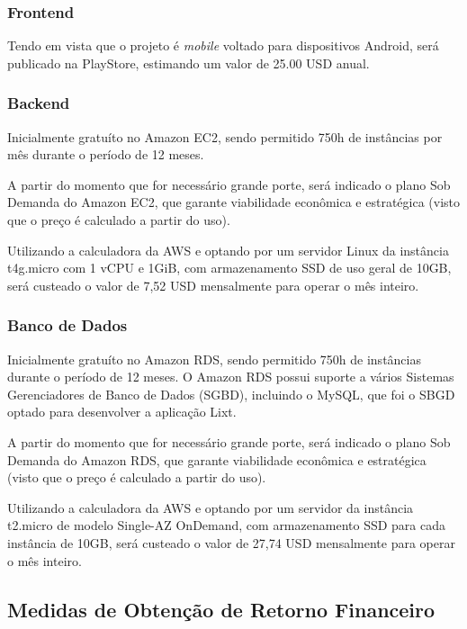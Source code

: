 \subsubsection{Frontend} 

Tendo em vista que o projeto é \textit{mobile} voltado para dispositivos Android, será publicado na PlayStore, estimando um valor de 25.00 USD anual. 

\subsubsection{Backend}

Inicialmente gratuíto no Amazon EC2, sendo permitido 750h de instâncias por mês durante o período de 12 meses.

A partir do momento que for necessário grande porte, será indicado o plano Sob Demanda do Amazon EC2, que garante viabilidade econômica e estratégica (visto que o preço é calculado a partir do uso). 

Utilizando a calculadora da AWS e optando por um servidor Linux da instância t4g.micro com 1 vCPU e 1GiB, com armazenamento SSD de uso geral de 10GB, será custeado o valor de 7,52 USD mensalmente para operar o mês inteiro.

\subsubsection{Banco de Dados} 

Inicialmente gratuíto no Amazon RDS, sendo permitido 750h de instâncias durante o período de 12 meses. O Amazon RDS possui suporte a vários Sistemas Gerenciadores de Banco de Dados (SGBD), incluindo o MySQL, que foi o SBGD optado para desenvolver a aplicação Lixt.

A partir do momento que for necessário grande porte, será indicado o plano Sob Demanda do Amazon RDS, que garante viabilidade econômica e estratégica (visto que o preço é calculado a partir do uso).

Utilizando a calculadora da AWS e optando por um servidor da instância t2.micro de modelo Single-AZ OnDemand, com armazenamento SSD para cada instância de 10GB, será custeado o valor de 27,74 USD mensalmente para operar o mês inteiro.

\subsection{Medidas de Obtenção de Retorno Financeiro}

